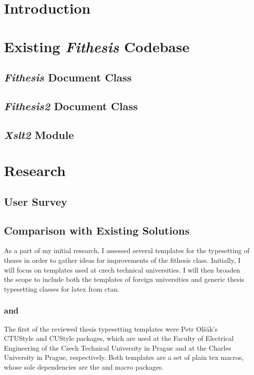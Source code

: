 \documentclass{article}
\begin{document}
  
  \tableofcontents
  \listoftables
  \listoffigures
  \newpage

  \section{Introduction}
  \section{Existing \emph{Fithesis} Codebase}
  \subsection{\emph{Fithesis} Document Class}
  \subsection{\emph{Fithesis2} Document Class}
  \subsection{\emph{Xslt2} Module}
  \section{Research}
  \subsection{User Survey}
  \subsection{Comparison with Existing Solutions}
  As a part of my initial research, I assessed several templates for the typesetting of theses in order to gather ideas for improvements of the fithesis class. Initially, I will focus on templates used at czech technical universities. I will then broaden the scope to include both the templates of foreign universities and generic thesis typesetting classes for \gls{latex} from \gls{ctan}.

  \subsubsection{ and }
  The first of the reviewed thesis typesetting templates were Petr Olšák's CTUStyle \cite{ctustyle} and CUStyle \cite{custyle} packages, which are used at the Faculty of Electrical Engineering of the Czech Technical University in Prague and at the Charles University in Prague, respectively. Both templates are a set of plain \gls{tex} macros, whose sole dependencies are the  and  macro packages.
  
\end{document}
